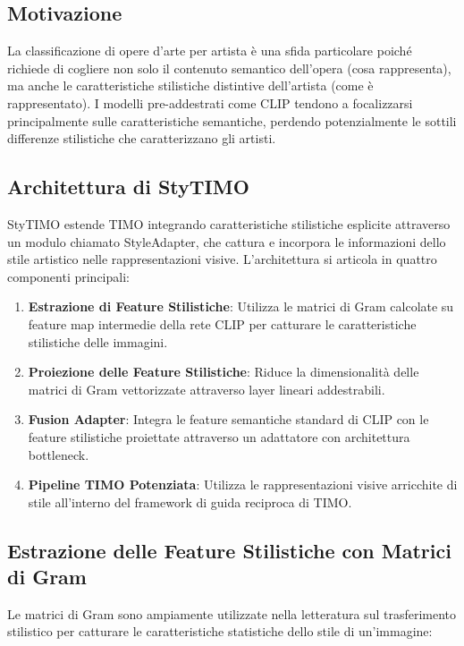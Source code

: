 \documentclass[11pt,a4paper]{article}
\begin{document}
\subsection{Motivazione}
La classificazione di opere d'arte per artista è una sfida particolare poiché richiede di cogliere non solo il contenuto semantico dell'opera (cosa rappresenta), ma anche le caratteristiche stilistiche distintive dell'artista (come è rappresentato). I modelli pre-addestrati come CLIP tendono a focalizzarsi principalmente sulle caratteristiche semantiche, perdendo potenzialmente le sottili differenze stilistiche che caratterizzano gli artisti.

\subsection{Architettura di StyTIMO}
StyTIMO estende TIMO integrando caratteristiche stilistiche esplicite attraverso un modulo chiamato StyleAdapter, che cattura e incorpora le informazioni dello stile artistico nelle rappresentazioni visive. L'architettura si articola in quattro componenti principali:

\begin{enumerate}
    \item \textbf{Estrazione di Feature Stilistiche}: Utilizza le matrici di Gram calcolate su feature map intermedie della rete CLIP per catturare le caratteristiche stilistiche delle immagini.
    
    \item \textbf{Proiezione delle Feature Stilistiche}: Riduce la dimensionalità delle matrici di Gram vettorizzate attraverso layer lineari addestrabili.
    
    \item \textbf{Fusion Adapter}: Integra le feature semantiche standard di CLIP con le feature stilistiche proiettate attraverso un adattatore con architettura bottleneck.
    
    \item \textbf{Pipeline TIMO Potenziata}: Utilizza le rappresentazioni visive arricchite di stile all'interno del framework di guida reciproca di TIMO.
\end{enumerate}

\subsection{Estrazione delle Feature Stilistiche con Matrici di Gram}
Le matrici di Gram sono ampiamente utilizzate nella letteratura sul trasferimento stilistico per catturare le caratteristiche statistiche dello stile di un'immagine:
\end{document}
